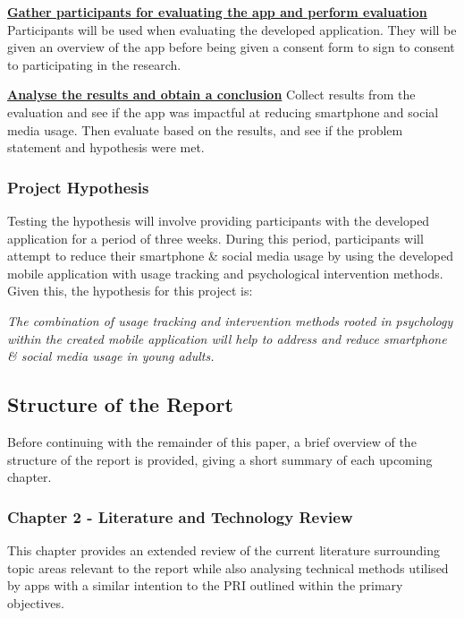 \documentclass[12pt]{article}
\begin{document}
\noindent\underline{\textbf{Gather participants for evaluating the app and perform evaluation}}\newline
Participants will be used when evaluating the developed application. They will be given an overview of the app 
before being given a consent form to sign to consent to participating in the research. \newline

\noindent\underline{\textbf{Analyse the results and obtain a conclusion}}\newline
Collect results from the evaluation and see if the app was impactful at reducing smartphone and social media usage. 
Then evaluate based on the results, and see if the problem statement and hypothesis were met.\newline 


\subsubsection{Project Hypothesis}
Testing the hypothesis will involve providing participants with the developed application for a period of three weeks.
During this period, participants will attempt to reduce their smartphone \& social media usage by using the developed mobile 
application with usage tracking and psychological intervention methods. Given this, the hypothesis for 
this project is: \newline

\noindent\textit{The combination of usage tracking and intervention methods rooted in psychology within the created mobile 
application will help to address and reduce smartphone \& social media usage in young adults.}
\newpage

\subsection{Structure of the Report}
Before continuing with the remainder of this paper, a brief overview of the structure of the report is provided, giving
a short summary of each upcoming chapter.

\subsubsection{Chapter 2 - Literature and Technology Review}
This chapter provides an extended review of the current literature surrounding topic areas relevant to the report while also
analysing technical methods utilised by apps with a similar intention to the PRI outlined within the primary objectives.
\end{document}

